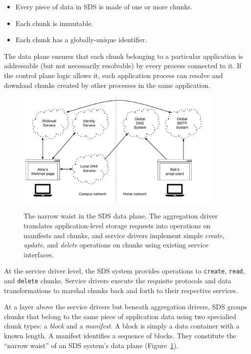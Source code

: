 \begin{itemize}
    \item Every piece of data in SDS is made of one or more chunks.
    \item Each chunk is immutable.
    \item Each chunk has a globally-unique identifier.
\end{itemize}

The data plane ensures that each chunk belonging to a particular application
is addressable (but not necessarily resolvable) by every process connected to it.
If the control plane logic allows it, each application
process can resolve and download chunks created by other processes in the same
application.

\begin{figure}[h]
   \caption{The narrow waist in the SDS data plane.  The aggregation driver
   translates application-level storage requests into operations on manifests
   and chunks, and service drivers implement simple \textit{create},
   \textit{update}, and \textit{delete} operations on chunks using existing
   service interfaces.}
   \centering
   \includegraphics[width=0.9\textwidth,page=4]{figures/dissertation-figures}
   \label{fig:chap2-narrow-waist}
\end{figure}

At the service driver level, the SDS
system provides operations to \texttt{create}, \texttt{read}, and
\texttt{delete} chunks.  Service drivers execute the requisite protocols
and data transformations to
marshal chunks back and forth to their respective services.

At a layer above the service drivers but beneath aggregation drivers, SDS
groups chunks that belong to the same piece of application data using two specialied
chunk types:  a \emph{block} and a \emph{manifest}.  A block is simply a data
container with a known length.  A manifest identifies a sequence of blocks.
They constitute the ``narrow waist'' of an SDS system's data plane
(Figure~\ref{fig:chap2-narrow-waist}).


